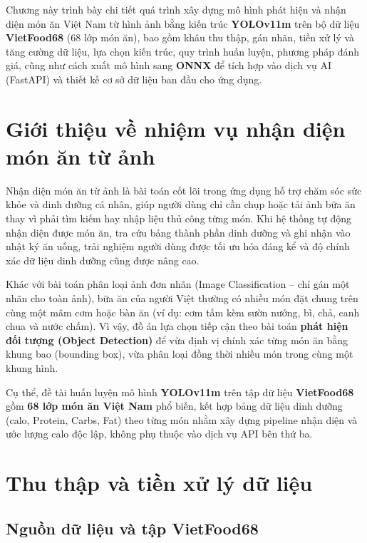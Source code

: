 \documentclass[../main.tex]{subfiles}
\begin{document}
Chương này trình bày chi tiết quá trình xây dựng mô hình phát hiện và nhận diện món ăn Việt Nam từ hình ảnh bằng kiến trúc \textbf{YOLOv11m} trên bộ dữ liệu \textbf{VietFood68} (68 lớp món ăn), bao gồm khâu thu thập, gán nhãn, tiền xử lý và tăng cường dữ liệu, lựa chọn kiến trúc, quy trình huấn luyện, phương pháp đánh giá, cũng như cách xuất mô hình sang \textbf{ONNX} để tích hợp vào dịch vụ AI (FastAPI) và thiết kế cơ sở dữ liệu ban đầu cho ứng dụng.

\section{Giới thiệu về nhiệm vụ nhận diện món ăn từ ảnh}
\label{sec:2.1}

Nhận diện món ăn từ ảnh là bài toán cốt lõi trong ứng dụng hỗ trợ chăm sóc sức khỏe và dinh dưỡng cá nhân, giúp người dùng chỉ cần chụp hoặc tải ảnh bữa ăn thay vì phải tìm kiếm hay nhập liệu thủ công từng món. Khi hệ thống tự động nhận diện được món ăn, tra cứu bảng thành phần dinh dưỡng và ghi nhận vào nhật ký ăn uống, trải nghiệm người dùng được tối ưu hóa đáng kể và độ chính xác dữ liệu dinh dưỡng cũng được nâng cao.

Khác với bài toán phân loại ảnh đơn nhãn (Image Classification -- chỉ gán một nhãn cho toàn ảnh), bữa ăn của người Việt thường có nhiều món đặt chung trên cùng một mâm cơm hoặc bàn ăn (ví dụ: cơm tấm kèm sườn nướng, bì, chả, canh chua và nước chấm). Vì vậy, đồ án lựa chọn tiếp cận theo bài toán \textbf{phát hiện đối tượng (Object Detection)} để vừa định vị chính xác từng món ăn bằng khung bao (bounding box), vừa phân loại đồng thời nhiều món trong cùng một khung hình.

Cụ thể, đề tài huấn luyện mô hình \textbf{YOLOv11m} trên tập dữ liệu \textbf{VietFood68} gồm \textbf{68 lớp món ăn Việt Nam} phổ biến, kết hợp bảng dữ liệu dinh dưỡng (calo, Protein, Carbs, Fat) theo từng món nhằm xây dựng pipeline nhận diện và ước lượng calo độc lập, không phụ thuộc vào dịch vụ API bên thứ ba.

\section{Thu thập và tiền xử lý dữ liệu}
\label{sec:2.2}

\subsection{Nguồn dữ liệu và tập VietFood68}
\end{document}
